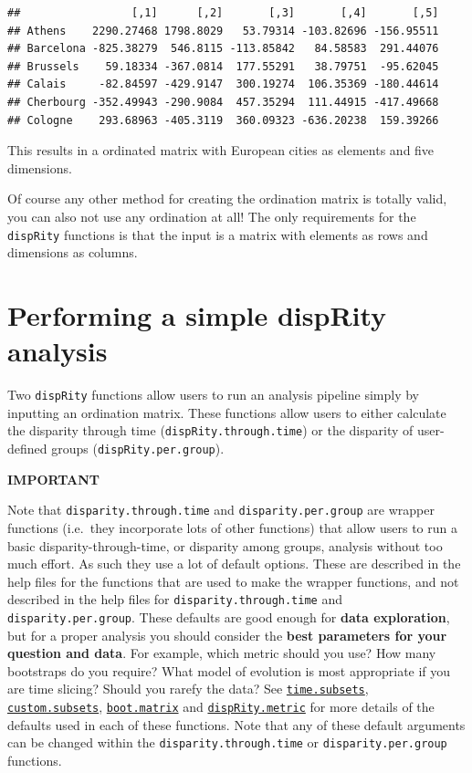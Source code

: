 \documentclass[]{book}
\theoremstyle{definition}
\theoremstyle{definition}
\theoremstyle{remark}
\begin{document}
\begin{verbatim}
##                 [,1]      [,2]       [,3]       [,4]       [,5]
## Athens    2290.27468 1798.8029   53.79314 -103.82696 -156.95511
## Barcelona -825.38279  546.8115 -113.85842   84.58583  291.44076
## Brussels    59.18334 -367.0814  177.55291   38.79751  -95.62045
## Calais     -82.84597 -429.9147  300.19274  106.35369 -180.44614
## Cherbourg -352.49943 -290.9084  457.35294  111.44915 -417.49668
## Cologne    293.68963 -405.3119  360.09323 -636.20238  159.39266
\end{verbatim}

This results in a ordinated matrix with European cities as elements and
five dimensions.

Of course any other method for creating the ordination matrix is totally
valid, you can also not use any ordination at all! The only requirements
for the \texttt{dispRity} functions is that the input is a matrix with
elements as rows and dimensions as columns.

\section{Performing a simple dispRity
analysis}\label{performing-a-simple-disprity-analysis}

Two \texttt{dispRity} functions allow users to run an analysis pipeline
simply by inputting an ordination matrix. These functions allow users to
either calculate the disparity through time
(\texttt{dispRity.through.time}) or the disparity of user-defined groups
(\texttt{dispRity.per.group}).

\textbf{IMPORTANT}

Note that \texttt{disparity.through.time} and
\texttt{disparity.per.group} are wrapper functions (i.e.~they
incorporate lots of other functions) that allow users to run a basic
disparity-through-time, or disparity among groups, analysis without too
much effort. As such they use a lot of default options. These are
described in the help files for the functions that are used to make the
wrapper functions, and not described in the help files for
\texttt{disparity.through.time} and \texttt{disparity.per.group}. These
defaults are good enough for \textbf{data exploration}, but for a proper
analysis you should consider the \textbf{best parameters for your
question and data}. For example, which metric should you use? How many
bootstraps do you require? What model of evolution is most appropriate
if you are time slicing? Should you rarefy the data? See
\protect\hyperlink{time-slicing}{\texttt{time.subsets}},
\protect\hyperlink{customised-subsets}{\texttt{custom.subsets}},
\protect\hyperlink{bootstraps-and-rarefactions}{\texttt{boot.matrix}}
and \protect\hyperlink{disparity-metrics}{\texttt{dispRity.metric}} for
more details of the defaults used in each of these functions. Note that
any of these default arguments can be changed within the
\texttt{disparity.through.time} or \texttt{disparity.per.group}
functions.
\end{document}
